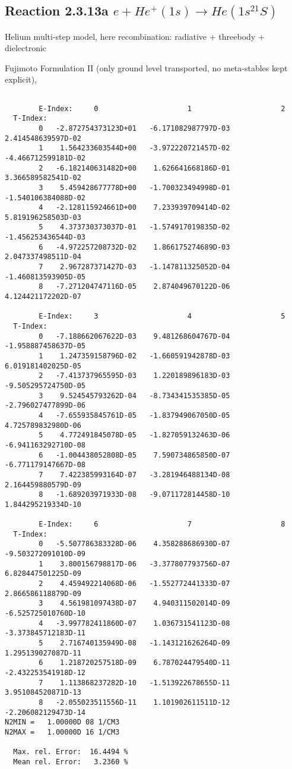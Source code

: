 \documentclass[12pt,dvipdfmx]{article}
\begin{document}
\subsection{
Reaction 2.3.13a  $e + He^+(1s) \rightarrow He(1s^21S) $
}

Helium multi-step model, here recombination: radiative + threebody + dielectronic

 Fujimoto Formulation II (only ground level transported, no meta-stables kept
explicit), \cite{kn:Fujimoto}


\begin{small}\begin{verbatim}

        E-Index:     0                     1                     2
  T-Index:
        0   -2.872754373123D+01   -6.171082987797D-03    2.414548639597D-02
        1    1.564233603544D+00   -3.972220721457D-02   -4.466712599181D-02
        2   -6.182140631482D+00    1.626641668186D-01    3.366589582541D-02
        3    5.459428677778D+00   -1.700323494998D-01   -1.540106384088D-02
        4   -2.128115924661D+00    7.233939709414D-02    5.819196258503D-03
        5    4.373730373037D-01   -1.574917019835D-02   -1.456253436544D-03
        6   -4.972257208732D-02    1.866175274689D-03    2.047337498511D-04
        7    2.967287371427D-03   -1.147811325052D-04   -1.460813593905D-05
        8   -7.271204747116D-05    2.874049670122D-06    4.124421172202D-07

        E-Index:     3                     4                     5
  T-Index:
        0   -7.188662067622D-03    9.481268604767D-04   -1.958887458637D-05
        1    1.247359158796D-02   -1.660591942878D-03    6.019181402025D-05
        2   -7.413737965595D-03    1.220189896183D-03   -9.505295724750D-05
        3    9.524545793262D-04   -8.734341535385D-05   -2.796027477899D-06
        4   -7.655935845761D-05   -1.837949067050D-05    4.725789832980D-06
        5    4.772491845078D-05   -1.827059132463D-06   -6.941163292710D-08
        6   -1.004438052808D-05    7.590734865850D-07   -6.771179147667D-08
        7    7.422385993164D-07   -3.281946488134D-08    2.164459880579D-09
        8   -1.689203971933D-08   -9.071172814458D-10    1.844295219334D-10

        E-Index:     6                     7                     8
  T-Index:
        0   -5.507786383328D-06    4.358288686930D-07   -9.503272091010D-09
        1    3.800156798817D-06   -3.377807793756D-07    6.828447501225D-09
        2    4.459492214068D-06   -1.552772441333D-07    2.866586118879D-09
        3    4.561981097438D-07    4.940311502014D-09   -6.525725010760D-10
        4   -3.997782411860D-07    1.036731541123D-08   -3.373845712183D-11
        5    2.716740135949D-08   -1.143121626264D-09    1.295139027087D-11
        6    1.218720257518D-09    6.787024479540D-11   -2.432253541918D-12
        7    1.113868237282D-10   -1.513922678655D-11    3.951084520871D-13
        8   -2.055023511556D-11    1.101902611511D-12   -2.206082129473D-14
N2MIN =   1.00000D 08 1/CM3
N2MAX =   1.00000D 16 1/CM3

  Max. rel. Error:  16.4494 %
  Mean rel. Error:   3.2360 %
\end{verbatim}\end{small}
\end{document}
